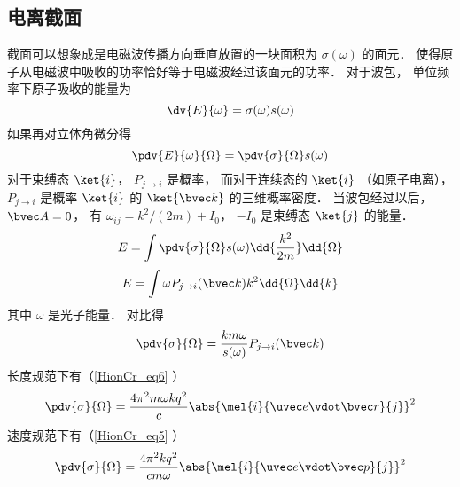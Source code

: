 \subsection{电离截面}
截面可以想象成是电磁波传播方向垂直放置的一块面积为 $\sigma(\omega)$ 的面元． 使得原子从电磁波中吸收的功率恰好等于电磁波经过该面元的功率． 对于波包， 单位频率下原子吸收的能量为
\begin{equation}
\dv{E}{\omega} = \sigma(\omega) s(\omega)
\end{equation}
如果再对立体角微分得
\begin{equation}
\pdv{E}{\omega}{\Omega} = \pdv{\sigma}{\Omega} s(\omega)
\end{equation}
对于束缚态 $\ket{i}$， $P_{j\to i}$ 是概率， 而对于连续态的 $\ket{i}$ （如原子电离）， $P_{j\to i}$ 是概率 $\ket{i}$ 的 $\ket{\bvec k}$ 的三维概率密度． 当波包经过以后， $\bvec A = 0$， 有 $\omega_{ij} = k^2/(2m) + I_0$， $-I_0$ 是束缚态 $\ket{j}$ 的能量．
\begin{equation}
E = \int \pdv{\sigma}{\Omega} s(\omega) \dd{\frac{k^2}{2m}}\dd{\Omega}
\end{equation}
\begin{equation}
E = \int \omega P_{j\to i}(\bvec k) k^2\dd{\Omega}\dd{k}
\end{equation}
其中 $\omega$ 是光子能量． 对比得
\begin{equation}
\pdv{\sigma}{\Omega} = \frac{km \omega}{s(\omega)} P_{j\to i}(\bvec k)
\end{equation}
长度规范下有（\autoref{HionCr_eq6} ）
\begin{equation}
\pdv{\sigma}{\Omega} = \frac{4\pi^2 m\omega k q^2}{c} \abs{\mel{i}{\uvec e \vdot\bvec r}{j}}^2
\end{equation}
速度规范下有（\autoref{HionCr_eq5} ）
\begin{equation}\label{HionCr_eq8} %
\pdv{\sigma}{\Omega} = \frac{4\pi^2 k q^2}{c m \omega} \abs{\mel{i}{\uvec e \vdot \bvec p}{j}}^2
\end{equation}
